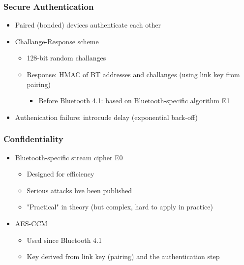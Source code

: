 \subsubsection{Secure Authentication}
\begin{itemize}
  \item Paired (bonded) devices authenticate each other
  \item Challange-Response scheme 
    \begin{itemize}
      \item 128-bit random challanges
      \item Response: HMAC of BT addresses and challanges (using link key from pairing) 
        \begin{itemize}
          \item Before Bluetooth 4.1: based on Bluetooth-specific algorithm E1
        \end{itemize}
    \end{itemize}
  \item Authenication failure: introcude delay (exponential back-off) 
\end{itemize}

\subsubsection{Confidentiality}
\begin{itemize}
  \item Bluetooth-specific stream cipher E0
    \begin{itemize}
      \item Designed for efficiency
      \item Serious attacks hve been published 
      \item "Practical" in theory (but complex, hard to apply in practice) 
    \end{itemize}
  \item AES-CCM 
    \begin{itemize}
      \item Used since Bluetooth 4.1
      \item Key derived from link key (pairing) and the authentication step 
    \end{itemize}
\end{itemize}

